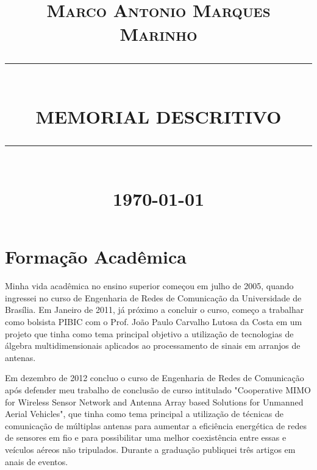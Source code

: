 \documentclass[12pt]{report}
\newcommand{\HRule}[1]{\rule{\linewidth}{#1}}
\begin{document}
\title{ \Large \textsc{Marco Antonio Marques Marinho}
		\\ [2.0cm]
		\HRule{0.5pt} \\
		\LARGE \textbf{\uppercase{Memorial Descritivo}}
		\HRule{2pt} \\ [0.5cm]
		\normalsize \today \vspace*{5\baselineskip}}

\date{}


\maketitle
\tableofcontents
\newpage

\sectionfont{\scshape}


\section*{Formação Acadêmica}

Minha vida acadêmica no ensino superior começou em julho de 2005, quando ingressei no curso de Engenharia de Redes de Comunicação da Universidade de Brasília. Em Janeiro de 2011, já próximo a concluir o curso, começo a trabalhar como bolsista PIBIC com o Prof. João Paulo Carvalho Lutosa da Costa em um projeto que tinha como tema principal objetivo a utilização de tecnologias de álgebra multidimensionais aplicados ao processamento de sinais em arranjos de antenas.

Em dezembro de 2012 concluo o curso de Engenharia de Redes de Comunicação após defender meu trabalho de conclusão de curso intitulado "Cooperative MIMO for Wireless Sensor Network and Antenna Array based Solutions for Unmanned Aerial Vehicles", que tinha como tema principal a utilização de técnicas de comunicação de múltiplas antenas para aumentar a eficiência energética de redes de sensores em fio e para possibilitar uma melhor coexistência entre essas e veículos aéreos não tripulados. Durante a graduação publiquei três artigos em anais de eventos.
\end{document}
